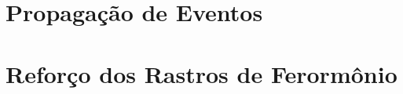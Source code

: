 \section{Propagação de Eventos}

\section{Reforço dos Rastros de Ferormônio}












































